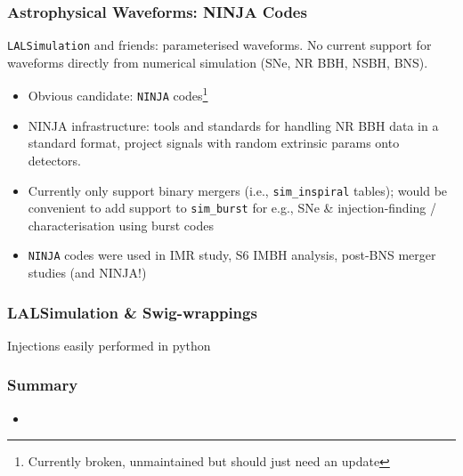 \documentclass{beamer}
\begin{document}
\begin{frame}
    \frametitle{Astrophysical Waveforms: NINJA Codes}
    {\tt LALSimulation} and friends: parameterised waveforms.  No current
    support for waveforms directly from numerical simulation (SNe, NR BBH, NSBH,
    BNS).
    \begin{itemize}
        \item Obvious candidate: {\tt NINJA} codes\footnote{Currently broken,
            unmaintained but should just need an update}
        \item NINJA infrastructure: tools and standards for handling NR BBH data in a
            standard format, project signals with random extrinsic params onto
            detectors.
        \item Currently only support binary mergers (i.e., {\tt sim\_inspiral} tables);
            would be convenient to add support to {\tt sim\_burst} for e.g., SNe
            \& injection-finding / characterisation using burst codes
        \item {\tt NINJA} codes were used in IMR study, S6 IMBH analysis,
            post-BNS merger studies (and NINJA!)
    \end{itemize}
\end{frame}

\begin{frame}
    \frametitle{LALSimulation \& Swig-wrappings}
    Injections easily performed in python

\end{frame}

\begin{frame}
    \frametitle{Summary}
    \begin{itemize}
        \item 
    \end{itemize}
\end{frame}
\end{document}

